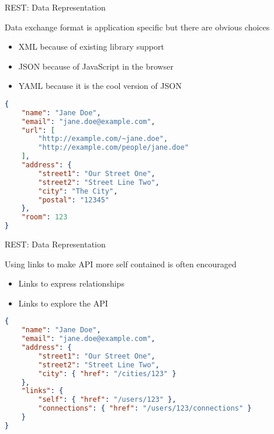 \begin{frame}[fragile]{REST: Data Representation}

    Data exchange format is application specific but there are obvious choices
    \begin{itemize}
        \item XML because of existing library support
        \item JSON because of JavaScript in the browser
        \item YAML because it is the cool version of JSON
    \end{itemize}

\begin{lstlisting}[language=json,style=mini]
{
    "name": "Jane Doe",
    "email": "jane.doe@example.com",
    "url": [
        "http://example.com/~jane.doe",
        "http://example.com/people/jane.doe"
    ],
    "address": {
        "street1": "Our Street One",
        "street2": "Street Line Two",
        "city": "The City",
        "postal": "12345"
    },
    "room": 123
}
\end{lstlisting}
\end{frame}


\begin{frame}[fragile]{REST: Data Representation}

    Using links to make API more self contained is often encouraged
    \begin{itemize}
        \item Links to express relationships
        \item Links to explore the API
    \end{itemize}

\begin{lstlisting}[language=json,style=mini]
{
    "name": "Jane Doe",
    "email": "jane.doe@example.com",
    "address": {
        "street1": "Our Street One",
        "street2": "Street Line Two",
        "city": { "href": "/cities/123" }
    },
    "links": {
        "self": { "href": "/users/123" },
        "connections": { "href": "/users/123/connections" }
    }
}
\end{lstlisting}
\end{frame}





